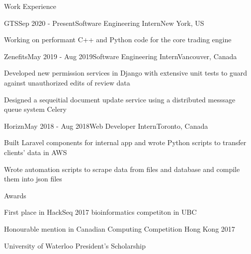 \documentclass{cv}
\begin{document}
\begin{rSection}{Work Experience}
\begin{rSubsection}{GTS}{Sep 2020 - Present}{Software Engineering Intern}{New York, US}
	\item Working on performant C++ and Python code for the core trading engine
\end{rSubsection}

\begin{rSubsection}{Zenefits}{May 2019 - Aug 2019}{Software Engineering Intern}{Vancouver, Canada}
	\item Developed new permission services in Django with extensive unit tests to guard against unauthorized edits of review data
	\item Designed a sequeitial document update service using a distributed messsage queue system Celery
\end{rSubsection}

\begin{rSubsection}{Horizn}{May 2018 - Aug 2018}{Web Developer Intern}{Toronto, Canada}
	\item Built Laravel components for internal app and wrote Python scripts to transfer clients’ data in AWS
	\item Wrote automation scripts to scrape data from files and database and compile them into json files
\end{rSubsection}
\end{rSection}

\begin{rSection}{Awards}
\begin{rSubsectionPure}
	\item First place in HackSeq 2017 bioinformatics competiton in UBC
	\item Honourable mention in Canadian Computing Competition Hong Kong 2017
	\item University of Waterloo President's Scholarship
\end{rSubsectionPure}
\end{rSection}
\end{document}
